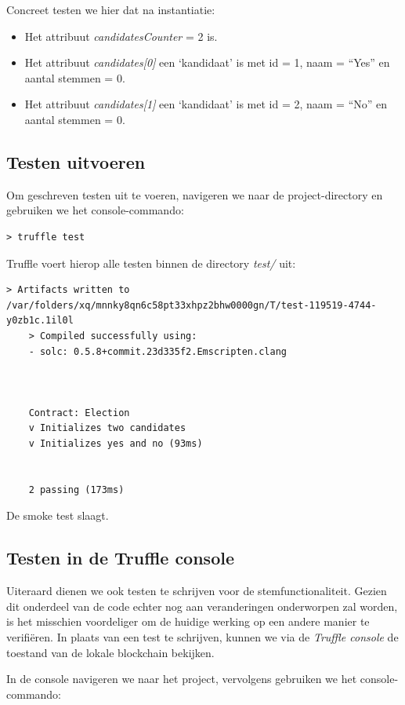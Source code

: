 	Concreet testen we hier dat na instantiatie:
	\begin{itemize}
		\item Het attribuut \textit{candidatesCounter} = 2 is.
		\item Het attribuut \textit{candidates[0]} een `kandidaat' is met id = 1, naam = ``Yes'' en aantal stemmen = 0.
		\item Het attribuut \textit{candidates[1]}  een `kandidaat' is met id = 2, naam = ``No'' en aantal stemmen = 0.
	\end{itemize}
	\subsection{Testen uitvoeren}
	Om geschreven testen uit te voeren, navigeren we naar de project-directory en gebruiken we het console-commando:
	
	\begin{lstlisting}[numbers=none]
	> truffle test
	\end{lstlisting}
	
	Truffle voert hierop alle testen binnen de directory \textit{test\slash} uit:
	
	\begin{lstlisting}[numbers=none]
	> Artifacts written to /var/folders/xq/mnnky8qn6c58pt33xhpz2bhw0000gn/T/test-119519-4744-y0zb1c.1il0l
	> Compiled successfully using:
	- solc: 0.5.8+commit.23d335f2.Emscripten.clang
	
	
	
	Contract: Election
	v Initializes two candidates
	v Initializes yes and no (93ms)
	
	
	2 passing (173ms)
	\end{lstlisting}
	
	De smoke test slaagt.
	
	\subsection{Testen in de Truffle console}
	Uiteraard dienen we  ook testen te schrijven voor de stemfunctionaliteit. Gezien dit onderdeel van de code echter nog aan veranderingen onderworpen zal worden, is het misschien voordeliger om de huidige werking op een andere manier te verifiëren. In plaats van een test te schrijven, kunnen we via de \textit{Truffle console} de toestand van de lokale blockchain bekijken.
	
	In de console navigeren we naar het project, vervolgens gebruiken we het console-commando:
	
